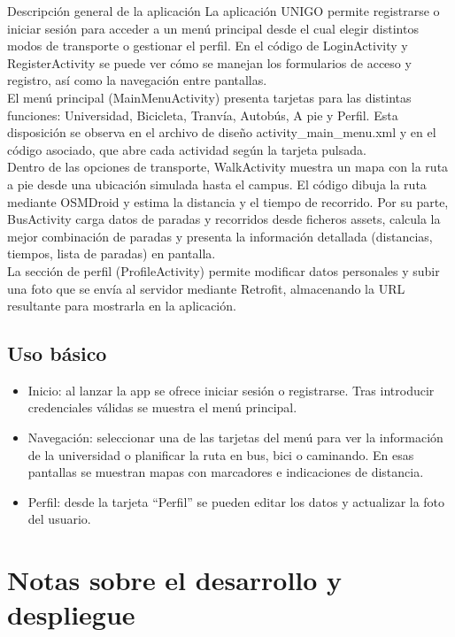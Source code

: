 \documentclass[11pt,a4paper]{article}
\begin{document}
Descripción general de la aplicación
La aplicación UNIGO permite registrarse o iniciar sesión para acceder a un menú principal desde el cual elegir distintos modos de transporte o gestionar el perfil. En el código de LoginActivity y RegisterActivity se puede ver cómo se manejan los formularios de acceso y registro, así como la navegación entre pantallas. \\

El menú principal (MainMenuActivity) presenta tarjetas para las distintas funciones: Universidad, Bicicleta, Tranvía, Autobús, A pie y Perfil. Esta disposición se observa en el archivo de diseño activity\_main\_menu.xml y en el código asociado, que abre cada actividad según la tarjeta pulsada. \\

Dentro de las opciones de transporte, WalkActivity muestra un mapa con la ruta a pie desde una ubicación simulada hasta el campus. El código dibuja la ruta mediante OSMDroid y estima la distancia y el tiempo de recorrido. Por su parte, BusActivity carga datos de paradas y recorridos desde ficheros assets, calcula la mejor combinación de paradas y presenta la información detallada (distancias, tiempos, lista de paradas) en pantalla. \\

La sección de perfil (ProfileActivity) permite modificar datos personales y subir una foto que se envía al servidor mediante Retrofit, almacenando la URL resultante para mostrarla en la aplicación.


\subsection{Uso básico}

\begin{itemize}
  \item  Inicio: al lanzar la app se ofrece iniciar sesión o registrarse. Tras introducir credenciales válidas se muestra el menú principal.
  \item Navegación: seleccionar una de las tarjetas del menú para ver la información de la universidad o planificar la ruta en bus, bici o caminando. En esas pantallas se muestran mapas con marcadores e indicaciones de distancia.
  \item Perfil: desde la tarjeta “Perfil” se pueden editar los datos y actualizar la foto del usuario.
    
\end{itemize}

\section{Notas sobre el desarrollo y despliegue}
\end{document}
